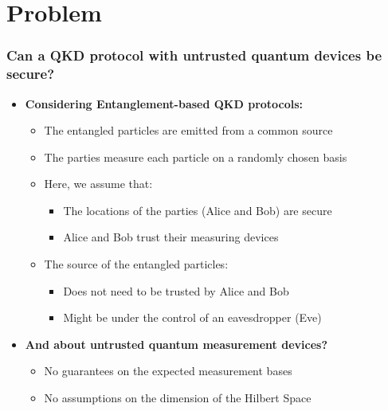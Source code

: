 \documentclass{beamer}
\begin{document}
  
	\section{Problem}

    \begin{frame}
        \frametitle{\normalsize Can a QKD protocol with untrusted quantum devices be secure?}

        \vspace{2.5ex}
        \begin{itemize}
            \item \textbf{Considering Entanglement-based QKD protocols:}
            \begin{itemize}\small
                \item The entangled particles are emitted from a common source
                \item The parties measure each particle on a randomly chosen basis
                \vspace{0.5ex}
                \item Here, we assume that:
                \begin{itemize}
                    \item The locations of the parties (Alice and Bob) are secure
                    \item Alice and Bob trust their measuring devices
                \end{itemize}
                \vspace{0.5ex}
                \item The source of the entangled particles:
                \begin{itemize}
                    \item Does not need to be trusted by Alice and Bob
                    \item Might be under the control of an eavesdropper (Eve)
                \end{itemize}
            \end{itemize}
            \vspace{1ex}
            \item \textbf{And about untrusted quantum measurement devices?}
            \vspace{-2.5ex}
            \begin{itemize}
                \item No guarantees on the expected measurement bases
                \item No assumptions on the dimension of the Hilbert Space
            \end{itemize}
        \end{itemize}
    \end{frame}
\end{document}
